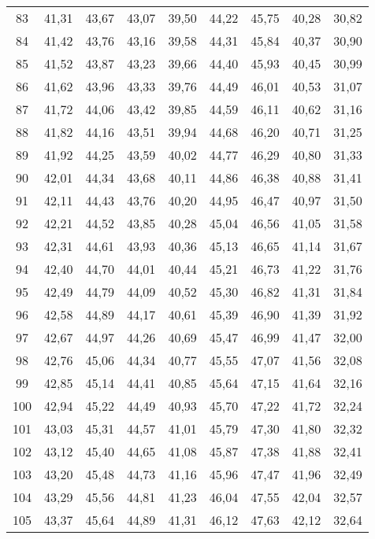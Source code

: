 \begin{longtable}{c c c c c c c c c}
      83	& 41,31	& 43,67	& 43,07	& 39,50	& 44,22	& 45,75	& 40,28	& 30,82 \\
      84	& 41,42	& 43,76	& 43,16	& 39,58	& 44,31	& 45,84	& 40,37	& 30,90 \\
      85	& 41,52	& 43,87	& 43,23	& 39,66	& 44,40	& 45,93	& 40,45	& 30,99 \\
      86	& 41,62	& 43,96	& 43,33	& 39,76	& 44,49	& 46,01	& 40,53	& 31,07 \\
      87	& 41,72	& 44,06	& 43,42	& 39,85	& 44,59	& 46,11	& 40,62	& 31,16 \\
      88	& 41,82	& 44,16	& 43,51	& 39,94	& 44,68	& 46,20	& 40,71	& 31,25 \\
      89	& 41,92	& 44,25	& 43,59	& 40,02	& 44,77	& 46,29	& 40,80	& 31,33 \\
      90	& 42,01	& 44,34	& 43,68	& 40,11	& 44,86	& 46,38	& 40,88	& 31,41 \\
      91	& 42,11	& 44,43	& 43,76	& 40,20	& 44,95	& 46,47	& 40,97	& 31,50 \\
      92	& 42,21	& 44,52	& 43,85	& 40,28	& 45,04	& 46,56	& 41,05	& 31,58 \\
      93	& 42,31	& 44,61	& 43,93	& 40,36	& 45,13	& 46,65	& 41,14	& 31,67 \\
      94	& 42,40	& 44,70	& 44,01	& 40,44	& 45,21	& 46,73	& 41,22	& 31,76 \\
      95	& 42,49	& 44,79	& 44,09	& 40,52	& 45,30	& 46,82	& 41,31	& 31,84 \\
      96	& 42,58	& 44,89	& 44,17	& 40,61	& 45,39	& 46,90	& 41,39	& 31,92 \\
      97	& 42,67	& 44,97	& 44,26	& 40,69	& 45,47	& 46,99	& 41,47	& 32,00 \\
      98	& 42,76	& 45,06	& 44,34	& 40,77	& 45,55	& 47,07	& 41,56	& 32,08 \\
      99	& 42,85	& 45,14	& 44,41	& 40,85	& 45,64	& 47,15	& 41,64	& 32,16 \\
      100	& 42,94	& 45,22	& 44,49	& 40,93	& 45,70	& 47,22	& 41,72	& 32,24 \\
      101	& 43,03	& 45,31	& 44,57	& 41,01	& 45,79	& 47,30	& 41,80	& 32,32 \\
      102	& 43,12	& 45,40	& 44,65	& 41,08	& 45,87	& 47,38	& 41,88	& 32,41 \\
      103	& 43,20	& 45,48	& 44,73	& 41,16	& 45,96	& 47,47	& 41,96	& 32,49 \\
      104	& 43,29	& 45,56	& 44,81	& 41,23	& 46,04	& 47,55	& 42,04	& 32,57 \\
      105	& 43,37	& 45,64	& 44,89	& 41,31	& 46,12	& 47,63	& 42,12	& 32,64 \\

\end{longtable}
